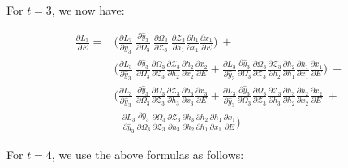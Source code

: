 \documentclass{article}
\begin{document}
For $t=3$, we now have:

\begin{align*}
	\frac{\partial L_3}{ \partial{E}} = &\biggl(\frac{\partial L_3}{\partial \hat{y}_3}~\frac{\partial \hat{y}_3}{\partial \Omega_3}~\frac{\partial \Omega_3}{ \partial \mathcal{Z}_3} ~ \frac{\partial \mathcal{Z}_3}{ \partial h_1} \frac{\partial h_1}{ \partial x_1} \frac{\partial x_1}{ \partial E} \biggl) ~+~\\
	& \biggl(\frac{\partial L_3}{\partial \hat{y}_3}~\frac{\partial \hat{y}_3}{\partial \Omega_3}\frac{\partial \Omega_3}{ \partial \mathcal{Z}_3} \frac{\partial \mathcal{Z}_3}{ \partial h_2} \frac{\partial h_2}{ \partial x_2} \frac{\partial x_2}{ \partial E} + \frac{\partial L_3}{\partial \hat{y}_3}\frac{\partial \hat{y}_3}{\partial \Omega_3}\frac{\partial \Omega_3}{ \partial \mathcal{Z}_3} \frac{\partial \mathcal{Z}_3}{ \partial h_2} \frac{\partial h_2}{ \partial h_1}\frac{\partial h_1}{ \partial x_1}\frac{\partial x_1}{ \partial E}\biggl)~+~\\
	& \biggl(
	\frac{\partial L_3}{\partial \hat{y}_3}~\frac{\partial \hat{y}_3}{\partial \Omega_3}\frac{\partial \Omega_3}{ \partial \mathcal{Z}_3} \frac{\partial \mathcal{Z}_3}{ \partial h_3} \frac{\partial h_3}{ \partial x_3} \frac{\partial x_3}{ \partial E} + \frac{\partial L_3}{\partial \hat{y}_3}\frac{\partial \hat{y}_3}{\partial \Omega_3}\frac{\partial \Omega_3}{ \partial \mathcal{Z}_3} \frac{\partial \mathcal{Z}_3}{ \partial h_3} \frac{\partial h_3}{ \partial h_2}\frac{\partial h_2}{ \partial x_2} \frac{\partial x_2}{ \partial E}~+~\\
	&~~~\frac{\partial L_3}{\partial \hat{y}_3}\frac{\partial \hat{y}_3}{\partial \Omega_3}\frac{\partial \Omega_3}{ \partial \mathcal{Z}_3} \frac{\partial \mathcal{Z}_3}{ \partial h_3} \frac{\partial h_3}{ \partial h_2}\frac{\partial h_2}{ \partial h_1}\frac{\partial h_1}{ \partial x_1}\frac{\partial x_1}{ \partial E}
	\biggl)
\end{align*}

For $t=4$, we use the above formulas as follows:
\end{document}
